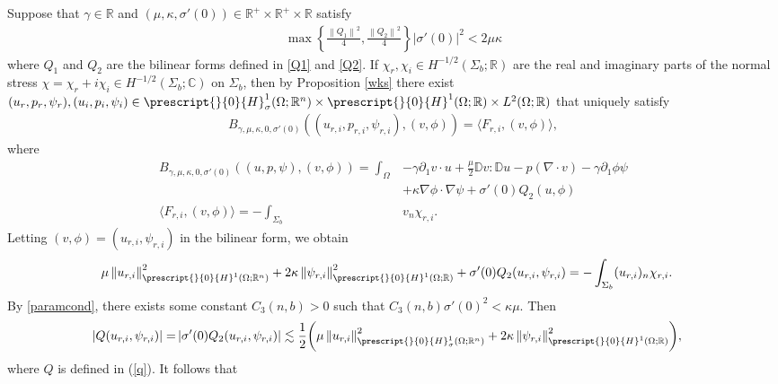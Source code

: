 \documentclass[11pt,letterpaper,reqno]{amsart}
\numberwithin{equation}{section}
\newcommand{\abs}[1]{\left\lvert#1\right\rvert}
\newcommand{\norm}[1]{\left\lVert#1\right\rVert}
\begin{document}
Suppose that \(\gamma\in \mathbb{R}\) and \((\mu,\kappa,\sigma'(0)) \in \mathbb{R}^{+} \times \mathbb{R}^{+} \times \mathbb{R}\) satisfy
\begin{align} \label{paramcond}
    \max\left\{\frac{\norm{Q_{1}}^{2}}{4},\frac{\norm{Q_{2}}^{2}}{4}\right\} \abs{\sigma'(0)}^{2} < 2\mu\kappa
\end{align}
where \(Q_{1}\) and \(Q_{2}\) are the bilinear forms defined in \eqref{Q1} and \eqref{Q2}. If \(\chi_{r},\chi_{i} \in H^{-1/2}(\Sigma_{b};\mathbb{R})\) are the real and imaginary parts of the normal stress \(\chi=\chi_{r}+i\chi_{i} \in H^{-1/2}(\Sigma_{b};\mathbb{C})\) on \(\Sigma_{b}\), then by Proposition \ref{wks} there exist \((u_{r},p_{r},\psi_{r}), (u_{i},p_{i},\psi_{i}) \in \prescript{}{0}{H}^{1}_{\sigma}(\Omega;\mathbb{R}^{n}) \times \prescript{}{0}{H}^{1}(\Omega;\mathbb{R}) \times L^{2}(\Omega;\mathbb{R})\) that uniquely satisfy
\begin{align} \label{weakform}
    B_{\gamma,\mu,\kappa,0,\sigma'(0)}((u_{r,i},p_{r,i},\psi_{r,i}),(v,\phi))=\langle F_{r,i},(v,\phi) \rangle,
\end{align}
where
\begin{align}
    B_{\gamma,\mu,\kappa,0,\sigma'(0)}((u,p,\psi),(v,\phi))=\int_{\Omega}&-\gamma \partial_{1}v \cdot u +\frac{\mu}{2}\mathbb{D}v:\mathbb{D}u-p(\nabla \cdot v)-\gamma\partial_{1}\phi\psi \nonumber\\
    &+\kappa\nabla\phi \cdot \nabla \psi +\sigma'(0)Q_{2}(u,\phi) \nonumber\\
    \langle F_{r,i},(v,\phi)\rangle = -\int_{\Sigma_{b}}&v_{n}\chi_{r,i}.
\end{align}
Letting \((v,\phi)=(u_{r,i},\psi_{r,i})\) in the bilinear form, we obtain
\begin{align}
    &\mu\norm{u_{r,i}}_{\prescript{}{0}{H}^{1}(\Omega;\mathbb{R}^{n})}^{2}+2\kappa\norm{\psi_{r,i}}_{\prescript{}{0}{H}^{1}(\Omega;\mathbb{R})}^{2}+\sigma'(0)Q_{2}(u_{r,i},\psi_{r,i}) = -\int_{\Sigma_{b}}(u_{r,i})_{n}\chi_{r,i}.
\end{align}
By \eqref{paramcond}, there exists some constant \(C_{3}(n,b) >0\) such that \(C_{3}(n,b)\sigma'(0)^{2} < \kappa\mu\). Then
\begin{align}
    \abs{Q(u_{r,i},\psi_{r,i})}=&\abs{\sigma'(0)Q_{2}(u_{r,i},\psi_{r,i})} \lesssim \frac{1}{2}\biggl(\mu\norm{u_{r,i}}_{\prescript{}{0}{H}^{1}_{\sigma}(\Omega;\mathbb{R}^{n})}^{2}+2\kappa\norm{\psi_{r,i}}_{\prescript{}{0}{H}^{1}(\Omega;\mathbb{R})}^{2}\biggr),
\end{align}
where \(Q\) is defined in (\ref{q}). It follows that
\end{document}
